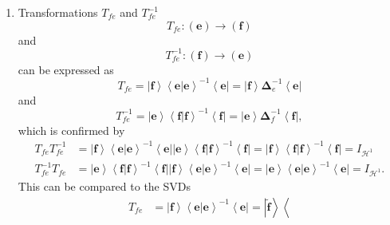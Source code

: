 \documentclass[aps,preprint]{revtex4}%
\begin{document}
\begin{enumerate}
\item Transformations $T_{fe}$ and $T_{fe}^{-1}$
\begin{equation}
T_{fe}:\left(  \mathbf{e}\right)  \rightarrow\left(  \mathbf{f}\right)
\end{equation}
and
\begin{equation}
T_{fe}^{-1}:\left(  \mathbf{f}\right)  \rightarrow\left(  \mathbf{e}\right)
\end{equation}
can be expressed as
\begin{equation}
T_{fe}=\left\vert \mathbf{f}\right\rangle \left\langle \left.  \mathbf{e}%
\right\vert \mathbf{e}\right\rangle ^{-1}\left\langle \mathbf{e}\right\vert
=\left\vert \mathbf{f}\right\rangle \mathbf{\Delta}_{e}^{-1}\left\langle
\mathbf{e}\right\vert
\end{equation}
and
\begin{equation}
T_{fe}^{-1}=\left\vert \mathbf{e}\right\rangle \left\langle \left.
\mathbf{f}\right\vert \mathbf{f}\right\rangle ^{-1}\left\langle \mathbf{f}%
\right\vert =\left\vert \mathbf{e}\right\rangle \mathbf{\Delta}_{f}%
^{-1}\left\langle \mathbf{f}\right\vert ,
\end{equation}
which is confirmed by%
\begin{align}
T_{fe}T_{fe}^{-1}  &  =\left\vert \mathbf{f}\right\rangle \left\langle \left.
\mathbf{e}\right\vert \mathbf{e}\right\rangle ^{-1}\left\langle \mathbf{e}%
\right\vert \left\vert \mathbf{e}\right\rangle \left\langle \left.
\mathbf{f}\right\vert \mathbf{f}\right\rangle ^{-1}\left\langle \mathbf{f}%
\right\vert =\left\vert \mathbf{f}\right\rangle \left\langle \left.
\mathbf{f}\right\vert \mathbf{f}\right\rangle ^{-1}\left\langle \mathbf{f}%
\right\vert =I_{\mathcal{H}^{1}}\\
T_{fe}^{-1}T_{fe}  &  =\left\vert \mathbf{e}\right\rangle \left\langle \left.
\mathbf{f}\right\vert \mathbf{f}\right\rangle ^{-1}\left\langle \mathbf{f}%
\right\vert \left\vert \mathbf{f}\right\rangle \left\langle \left.
\mathbf{e}\right\vert \mathbf{e}\right\rangle ^{-1}\left\langle \mathbf{e}%
\right\vert =\left\vert \mathbf{e}\right\rangle \left\langle \left.
\mathbf{e}\right\vert \mathbf{e}\right\rangle ^{-1}\left\langle \mathbf{e}%
\right\vert =I_{\mathcal{H}^{1}}.
\end{align}
This can be compared to the SVDs
\begin{align}
T_{fe}  &  =\left\vert \mathbf{f}\right\rangle \left\langle \left.
\mathbf{e}\right\vert \mathbf{e}\right\rangle ^{-1}\left\langle \mathbf{e}%
\right\vert =\left\vert \widetilde{\mathbf{f}}\right\rangle \left\langle

\end{align}
\end{enumerate}
\end{document}
